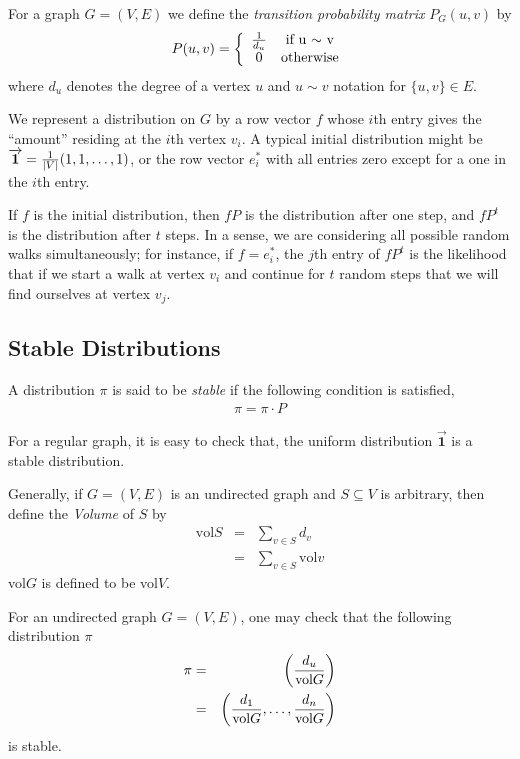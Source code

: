 For a graph $G=(V,E)$ we define the \emph{transition probability matrix} $P_G(u,v)$ by
\begin{eqnarray*}
P(u,v)=\left\{
\begin{array}{cc}
1\over d_u & \textrm{if u $\sim$ v}\\
0 & \textrm{otherwise}
\end{array}
\right.
\end{eqnarray*}
where $d_u$ denotes the degree of a vertex $u$ and $u\sim v$ notation for
$\{u,v\}\in E$.

We represent a distribution on $G$ by a row vector $f$ whose $i$th
entry gives the ``amount'' residing at the $i$th vertex $v_i$. A
typical initial distribution might be
$\overrightarrow{\mathbf{1}}={1\over |V|}(1,1,\dots,1)$, or the row
vector $e^*_i$ with all entries zero except for a one in the $i$th
entry.

If $f$ is the initial distribution, then $fP$ is the distribution after one step,
and $fP^t$ is the distribution after $t$ steps. In a sense, we are considering all
possible random walks simultaneously; for instance, if $f=e^*_i$, the $j$th entry of
$fP^t$ is the likelihood that if we start a walk at vertex $v_i$ and continue for
$t$ random steps that we will find ourselves at vertex $v_j$.

\subsection{Stable Distributions}
A distribution $\pi$ is said to be \emph{stable} if the following condition is
satisfied,
\begin{eqnarray*}
\pi = \pi \cdot P
\end{eqnarray*}

For a regular graph, it is easy to check that, the uniform distribution
$\overrightarrow{\mathbf{1}}$ is a stable distribution.

Generally, if $G=(V,E)$ is an undirected graph and $S\subseteq V$ is arbitrary, then
define the \emph{Volume} of $S$ by
\begin{eqnarray*}
\text{vol} S&=&\sum_{v\in S}d_v\\
&=&\sum_{v\in S}\text{vol} v
\end{eqnarray*}
vol$G$ is defined to be vol$V$.

For an undirected graph $G=(V,E)$, one may check that the following distribution
$\pi$
\begin{eqnarray*}
\pi&=&\left(d_u\over\text{vol}G\right)\\
&=&\left({d_1\over \text{vol}G}, \dots, {d_n\over\text{vol}G}\right)
\end{eqnarray*}
is stable.

